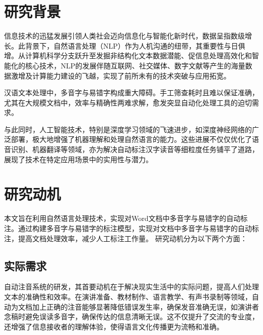 \documentclass[12pt,hyperref,a4paper,UTF8]{ctexart}
\begin{document}
\cover

%
%

\thispagestyle{empty} %

\newpage
\tableofcontents

\newpage


\section{研究背景}
信息技术的迅猛发展引领人类社会迈向信息化与智能化新时代，数据呈指数级增长。此背景下，自然语言处理（NLP）作为人机沟通的纽带，其重要性与日俱增。从计算机科学分支跃升至发掘非结构化文本数据潜能、促信息处理高效化和智能化的核心技术，NLP的发展伴随互联网、社交媒体、数字文献等产生的海量数据激增及计算能力建设的飞越，实现了前所未有的技术突破与应用拓宽。

汉语文本处理中，多音字与易错字构成重大障碍。手工筛查耗时且难以保证准确，尤其在大规模文档中，效率与精确性两难求解，愈发突显自动化处理工具的迫切需求。

与此同时，人工智能技术，特别是深度学习领域的飞速进步，如深度神经网络的广泛部署，极大地增强了机器理解和处理自然语言的能力。这些进展不仅仅优化了语音识别、机器翻译等领域，亦为解决自动标注汉字读音等细粒度任务铺平了道路，展现了技术在特定应用场景中的实用性与潜力。
\section{研究动机}
本文旨在利用自然语言处理技术，实现对Word文档中多音字与易错字的自动标注。通过构建多音字与易错字的标注模型，实现对文档中多音字与易错字的自动标注，提高文档处理效率，减少人工标注工作量。
研究动机分为以下两个方面：
\subsection{实际需求}
自动注音系统的研发，其首要动机在于解决现实生活中的实际问题，提高人们处理文本的准确性和效率。在演讲准备、教材制作、语言教学、有声书录制等领域，自动为文档加上正确的注音能够显著降低错误发生率，确保发音准确无误，如演讲者念稿时避免误读多音字，确保传达的信息清晰无误。这不仅提升了交流的专业度，还增强了信息接收者的理解体验，使得语言文化传播更为流畅和准确。
\end{document}
